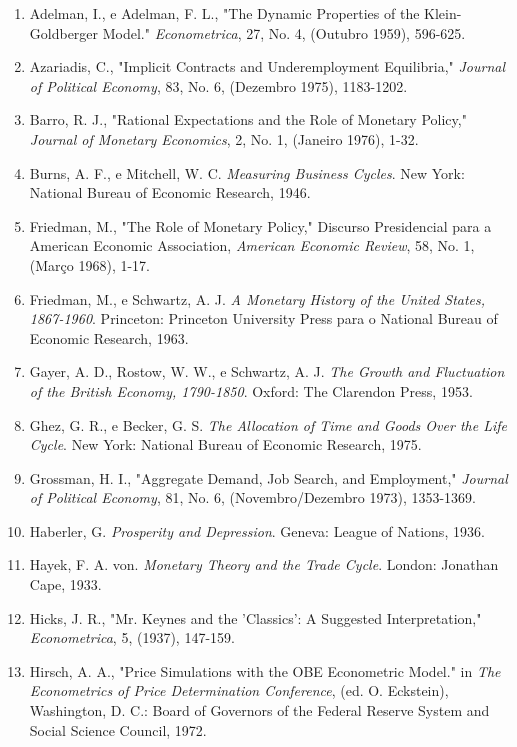 \documentclass[12pt]{article}
\begin{document}
\begin{enumerate}
    \item Adelman, I., e Adelman, F. L., "The Dynamic Properties of the Klein-Goldberger Model." \textit{Econometrica}, 27, No. 4, (Outubro 1959), 596-625.
    \item Azariadis, C., "Implicit Contracts and Underemployment Equilibria," \textit{Journal of Political Economy}, 83, No. 6, (Dezembro 1975), 1183-1202.
    \item Barro, R. J., "Rational Expectations and the Role of Monetary Policy," \textit{Journal of Monetary Economics}, 2, No. 1, (Janeiro 1976), 1-32.
    \item Burns, A. F., e Mitchell, W. C. \textit{Measuring Business Cycles}. New York: National Bureau of Economic Research, 1946.
    \item Friedman, M., "The Role of Monetary Policy," Discurso Presidencial para a American Economic Association, \textit{American Economic Review}, 58, No. 1, (Março 1968), 1-17.
    \item Friedman, M., e Schwartz, A. J. \textit{A Monetary History of the United States, 1867-1960}. Princeton: Princeton University Press para o National Bureau of Economic Research, 1963.
    \item Gayer, A. D., Rostow, W. W., e Schwartz, A. J. \textit{The Growth and Fluctuation of the British Economy, 1790-1850}. Oxford: The Clarendon Press, 1953.
    \item Ghez, G. R., e Becker, G. S. \textit{The Allocation of Time and Goods Over the Life Cycle}. New York: National Bureau of Economic Research, 1975.
    \item Grossman, H. I., "Aggregate Demand, Job Search, and Employment," \textit{Journal of Political Economy}, 81, No. 6, (Novembro/Dezembro 1973), 1353-1369.
    \item Haberler, G. \textit{Prosperity and Depression}. Geneva: League of Nations, 1936.
    \item Hayek, F. A. von. \textit{Monetary Theory and the Trade Cycle}. London: Jonathan Cape, 1933.
    \item Hicks, J. R., "Mr. Keynes and the 'Classics': A Suggested Interpretation," \textit{Econometrica}, 5, (1937), 147-159.
    \item Hirsch, A. A., "Price Simulations with the OBE Econometric Model." in \textit{The Econometrics of Price Determination Conference}, (ed. O. Eckstein), Washington, D. C.: Board of Governors of the Federal Reserve System and Social Science Council, 1972.

\end{enumerate}
\end{document}
